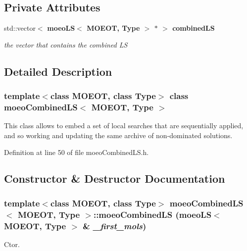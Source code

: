 \subsection*{Private Attributes}
\begin{CompactItemize}
\item 
std::vector$<$ \bf{moeo\-LS}$<$ MOEOT, Type $>$ $\ast$ $>$ \bf{combined\-LS}\label{classmoeoCombinedLS_3cf36ae7ada10d2837b60df01210d92a}

\begin{CompactList}\small\item\em the vector that contains the combined LS \item\end{CompactList}\end{CompactItemize}


\subsection{Detailed Description}
\subsubsection*{template$<$class MOEOT, class Type$>$ class moeo\-Combined\-LS$<$ MOEOT, Type $>$}

This class allows to embed a set of local searches that are sequentially applied, and so working and updating the same archive of non-dominated solutions. 



Definition at line 50 of file moeo\-Combined\-LS.h.

\subsection{Constructor \& Destructor Documentation}
\subsubsection{\setlength{\rightskip}{0pt plus 5cm}template$<$class MOEOT, class Type$>$ \bf{moeo\-Combined\-LS}$<$ MOEOT, Type $>$::\bf{moeo\-Combined\-LS} (\bf{moeo\-LS}$<$ MOEOT, Type $>$ \& {\em \_\-first\_\-mols})\hspace{0.3cm}{\tt  [inline]}}\label{classmoeoCombinedLS_5d09220b47bac67bd332dc0f93226ae1}


Ctor. 

